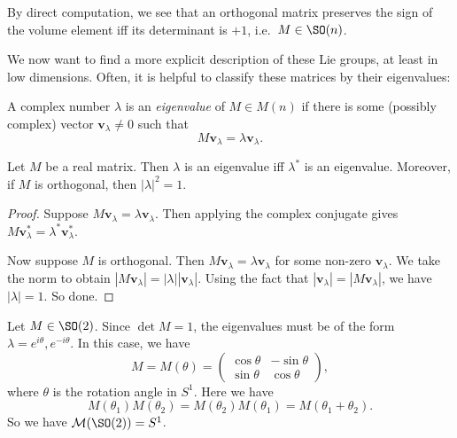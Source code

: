 \documentclass[a4paper]{article}
\begin{document}
By direct computation, we see that an orthogonal matrix preserves the sign of the volume element iff its determinant is $+1$, i.e.\ $M \in \SO(n)$.

We now want to find a more explicit description of these Lie groups, at least in low dimensions. Often, it is helpful to classify these matrices by their eigenvalues:

\begin{defi}[Eigenvalue]
  A complex number $\lambda$ is an \emph{eigenvalue} of $M \in M(n)$ if there is some (possibly complex) vector $\mathbf{v}_\lambda \not= 0$ such that
  \[
    M \mathbf{v}_\lambda = \lambda \mathbf{v}_\lambda.
  \]
\end{defi}

\begin{thm}
  Let $M$ be a real matrix. Then $\lambda$ is an eigenvalue iff $\lambda^*$ is an eigenvalue. Moreover, if $M$ is orthogonal, then $|\lambda|^2 = 1$.
\end{thm}

\begin{proof}
  Suppose $M \mathbf{v}_\lambda = \lambda \mathbf{v}_\lambda$. Then applying the complex conjugate gives $M \mathbf{v}_\lambda^* = \lambda^* \mathbf{v}_\lambda^*$.

  Now suppose $M$ is orthogonal. Then $M\mathbf{v}_\lambda = \lambda \mathbf{v}_\lambda$ for some non-zero $\mathbf{v}_\lambda$. We take the norm to obtain $|M\mathbf{v}_\lambda| = |\lambda| |\mathbf{v}_\lambda|$. Using the fact that $|\mathbf{v}_\lambda| = |M\mathbf{v}_\lambda|$, we have $|\lambda| = 1$. So done.
\end{proof}

\begin{eg}
  Let $M \in \SO(2)$. Since $\det M = 1$, the eigenvalues must be of the form $\lambda = e^{i\theta}, e^{-i\theta}$. In this case, we have
  \[
    M = M(\theta) =
    \begin{pmatrix}
      \cos \theta & -\sin \theta\\
      \sin \theta & \cos \theta
    \end{pmatrix},
  \]
  where $\theta$ is the rotation angle in $S^1$. Here we have
  \[
    M(\theta_1)M(\theta_2) = M(\theta_2) M(\theta_1) = M(\theta_1 + \theta_2).
  \]
  So we have $\mathcal{M}(\SO(2)) = S^1$.
\end{eg}
\end{document}
